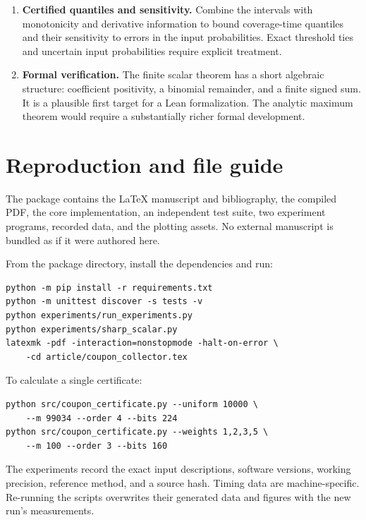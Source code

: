 \documentclass[11pt,a4paper]{article}
\theoremstyle{definition}
\begin{document}
\begin{enumerate}[label=\textbf{Q\arabic*.},leftmargin=2.7em]
\item \textbf{Certified quantiles and sensitivity.}
Combine the intervals with monotonicity and derivative information to
bound coverage-time quantiles and their sensitivity to errors in the
input probabilities. Exact threshold ties and uncertain input
probabilities require explicit treatment.

\item \textbf{Formal verification.}
The finite scalar theorem has a short algebraic structure: coefficient
positivity, a binomial remainder, and a finite signed sum. It is a
plausible first target for a Lean formalization. The analytic maximum
theorem would require a substantially richer formal development.
\end{enumerate}

\appendix
\section{Reproduction and file guide}\label{app:reproduction}

The package contains the LaTeX manuscript and bibliography, the compiled
PDF, the core implementation, an independent test suite, two experiment
programs, recorded data, and the plotting assets. No external manuscript
is bundled as if it were authored here.

From the package directory, install the dependencies and run:
\begin{lstlisting}
python -m pip install -r requirements.txt
python -m unittest discover -s tests -v
python experiments/run_experiments.py
python experiments/sharp_scalar.py
latexmk -pdf -interaction=nonstopmode -halt-on-error \
    -cd article/coupon_collector.tex
\end{lstlisting}
To calculate a single certificate:
\begin{lstlisting}
python src/coupon_certificate.py --uniform 10000 \
    --m 99034 --order 4 --bits 224
python src/coupon_certificate.py --weights 1,2,3,5 \
    --m 100 --order 3 --bits 160
\end{lstlisting}
The experiments record the exact input descriptions, software versions,
working precision, reference method, and a source hash. Timing data are
machine-specific. Re-running the scripts overwrites their generated data
and figures with the new run's measurements.
\end{document}
